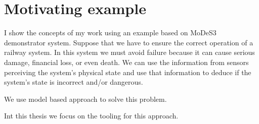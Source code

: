 \chapter{Motivating example}


I show the concepts of my work using an example based on MoDeS3~\cite{} demonstrator system. Suppose that we have to ensure the correct operation of a railway system. In this system we must avoid failure because it can cause serious damage, financial loss, or even death. We can use the information from sensors perceiving the system's physical state and use that information to deduce if the system's state is incorrect and/or dangerous. 

We use model based approach to solve this problem. 

Int this thesis we focus on the tooling for this approach. 




